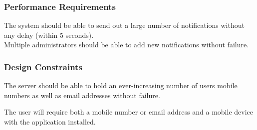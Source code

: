 \documentclass[runningheads,a4paper]{article}
\begin{document}
\subsubsection{Performance Requirements}

The system should be able to send out a large number of notifications without any delay (within 5 seconds).\\

Multiple administrators should be able to add new notifications without failure.



\subsubsection{Design Constraints}

The server should be able to hold an ever-increasing number of users mobile numbers as well as email addresses without failure.  

The user will require both a mobile number or email address and a mobile device with the application installed.
\end{document}
